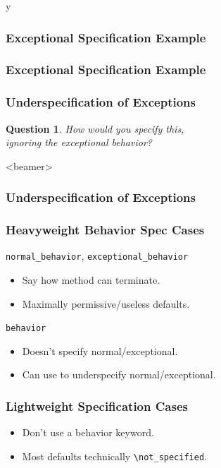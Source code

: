 \if y\MAKEHANDOUTS \documentclass[t,compress,landscape,handout]{beamer}
\newtheorem*{question}{Question}
\begin{document}
\begin{frame}[fragile]
\frametitle{Exceptional Specification Example}

\end{frame}

\begin{frame}[fragile]
\frametitle{Exceptional Specification Example}

\end{frame}

\begin{frame}
\frametitle{Underspecification of Exceptions}
\begin{question}
How would you specify this, \\
ignoring the exceptional behavior? 
\end{question}
\end{frame}

\begin{frame}<beamer>
\frametitle{Underspecification of Exceptions}

\end{frame}


\begin{frame}[fragile]
\frametitle{Heavyweight Behavior Spec Cases}

\lstinline!normal_behavior!, \lstinline!exceptional_behavior!
\begin{itemize}
\item
Say how method can terminate.

\item
Maximally permissive/useless defaults.
\end{itemize}

\lstinline!behavior!
\begin{itemize}
\item
Doesn't specify normal/exceptional.

\item
Can use to underspecify normal/exceptional.
\end{itemize}
\end{frame}

\begin{frame}[fragile]
\frametitle{Lightweight Specification Cases}

\begin{itemize}
\item
Don't use a behavior keyword.

\item
Most defaults technically \lstinline!\not_specified!.
\end{itemize}
\end{frame}
\end{document}
